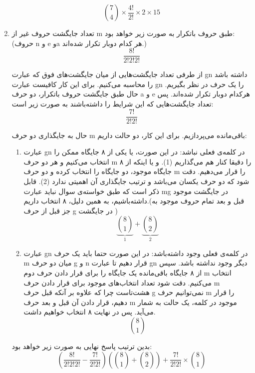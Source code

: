 \begin{enumerate}
    $${7\choose 4} \times \frac{4!}{2!} \times 2 \times 15$$

    \item
    \p
    تعداد جایگشت حروف غیر از m
    طبق حروف باتکرار به صورت زیر خواهد بود:
    (حروف n و e وa هر کدام دوبار تکرار شده‌اند.)
    $$\frac{8!}{2!2!2!}$$
    
    از طرفی تعداد جایگشت‌هایی از میان جایگشت‌های فوق که عبارت gn داشته باشد را محاسبه می‌کنیم. برای این کار کافیست عبارت gn را یک حرف در نظر بگیریم. حال طبق جایگشت حروف باتکرار، دو حرف a و e هرکدام دوبار تکرار شده‌اند. پس تعداد جایگشت‌هایی که این شرایط را داشته‌باشند به صورت زیر است:
    $$\frac{7!}{2!2!}$$
    
    حال به جایگذاری دو حرف m باقی‌مانده می‌پردازیم. برای این کار، دو حالت داریم:
    \begin{enumerate}
      \item 
      \p
      عبارت gn در کلمه‌ی فعلی نباشد:
            در این صورت، یا یکی از ۸ جایگاه ممکن را انتخاب می‌کنیم و هر دو حرف m را دقیقا کنار هم می‌گذاریم
      (1).
            و یا اینکه از ۸ جایگاه موجود، دو جایگاه را انتخاب کرده و دو حرف m را قرار می‌دهیم. دقت شود که دو حرف یکسان می‌باشد و ترتیب جایگذاری آن اهمیتی ندارد (2).
      قابل ذکر است که طبق خواسته‌ی سوال نباید عبارت  mg در جایگشت موجود داشته‌باشیم، به همین دلیل، ۸ انتخاب داریم.(قبل و بعد تمام حروف موجود به جز قبل از حرف g در جایگشت )
      $$\underbrace{8\choose 1}_{1} + \underbrace{8\choose 2}_{2}$$
      \item
      \p
      عبارت gn در کلمه‌ی فعلی وجود داشته‌باشد:
      در این صورت حتما باید یک حرف m میان دو حرف 
      g و n قرار دهیم تا عبارت gn دیگر وجود نداشته باشد.
      سپس از ۸ جایگاه باقی‌مانده یک جایگاه را برای قرار دادن حرف دوم m انتخاب می‌کنیم. دقت شود تعداد انتخاب‌های موجود برای قرار دادن حرف m هشت‌تاست چرا که علاوه بر آنکه قبل حرف g نمی‌توانیم حرف m را قرار دهیم، قرار دادن آن قبل و بعد حرف m موجود در کلمه، یک حالت به شمار می‌آید. پس در نهایت ۸ انتخاب خواهیم داشت.
      $${8\choose 1}$$
    \end{enumerate}
    \p
    بدین ترتیب پاسخ نهایی به صورت زیر خواهد بود:
    $$(\frac{8!}{2!2!2!} - \frac{7!}{2!2!})({8\choose 1} + {8\choose 2}) + \frac{7!}{2!2!} \times {8\choose 1}$$
  \end{enumerate}
